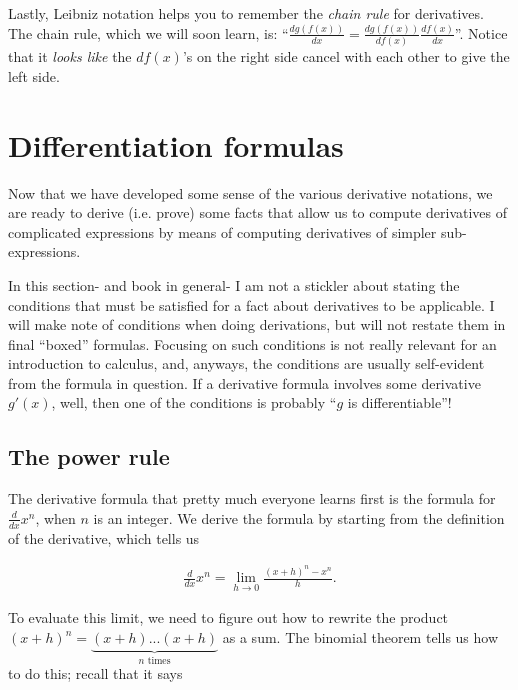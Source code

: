 Lastly, Leibniz notation helps you to remember the \textit{chain rule} for derivatives. The chain rule, which we will soon learn, is: ``$\frac{dg(f(x))}{dx} = \frac{dg(f(x))}{df(x)} \frac{df(x)}{dx}$''. Notice that it \textit{looks like} the $df(x)$'s on the right side cancel with each other to give the left side.
         
\section*{Differentiation formulas}

Now that we have developed some sense of the various derivative notations, we are ready to derive (i.e. prove) some facts that allow us to compute derivatives of complicated expressions by means of computing derivatives of simpler sub-expressions.

In this section- and book in general- I am not a stickler about stating the conditions that must be satisfied for a fact about derivatives to be applicable. I will make note of conditions when doing derivations, but will not restate them in final ``boxed'' formulas. Focusing on such conditions is not really relevant for an introduction to calculus, and, anyways, the conditions are usually self-evident from the formula in question. If a derivative formula involves some derivative $g'(x)$, well, then one of the conditions is probably ``$g$ is differentiable''!

\subsection*{The power rule}

The derivative formula that pretty much everyone learns first is the formula for $\frac{d}{dx} x^n$, when $n$ is an integer. We derive the formula by starting from the definition of the derivative, which tells us

\begin{align*}
    \frac{d}{dx} x^n = \lim_{h \rightarrow 0} \frac{(x + h)^n - x^n}{h}.
\end{align*}

To evaluate this limit, we need to figure out how to rewrite the product $(x + h)^n = \underbrace{(x + h) ... (x + h)}_{\text{$n$ times}}$ as a sum. The binomial theorem tells us how to do this; recall that it says

\newcommand*{\permcomb}[4][0mu]{{{}_{#3}\mkern#1#2_{#4}}}
\newcommand*{\perm}[1][-3mu]{\permcomb[#1]{P}}
\newcommand*{\comb}[1][-1mu]{\permcomb[#1]{C}}

